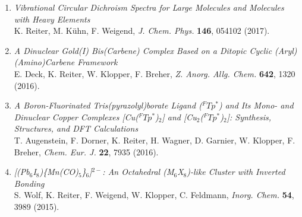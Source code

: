 \begin{enumerate}
\item \textit{Vibrational Circular Dichroism Spectra for Large Molecules and Molecules with Heavy Elements}\\
K. Reiter, M. Kühn, F. Weigend, \textit{J. Chem. Phys.} \textbf{146}, 054102 (2017).

\item \textit{A Dinuclear Gold(I) Bis(Carbene) Complex Based on a Ditopic Cyclic (Aryl)\\(Amino)Carbene Framework}\\
E. Deck, K. Reiter, W. Klopper, F. Breher, \textit{Z. Anorg. Allg. Chem.} \textbf{642}, 1320 (2016).

\item \textit{A Boron-Fluorinated Tris(pyrazolyl)borate Ligand ($^FTp^*$) and Its Mono- and Dinuclear Copper Complexes [Cu($^FTp^*$)$_2$] and [Cu$_2$($^FTp^*$)$_2$]: Synthesis, Structures, and DFT Calculations}\\
T. Augenstein, F. Dorner, K. Reiter, H. Wagner, D. Garnier, W. Klopper, F. Breher, \textit{Chem. Eur. J.} \textbf{22}, 7935 (2016).

\item \textit{[(Pb$_6$I$_8$)\{Mn(CO)$_5$\}$_6$]$^{2-}$: An Octahedral (M$_6$X$_8$)-like Cluster with Inverted Bonding}\\
S. Wolf, K. Reiter, F. Weigend, W. Klopper, C. Feldmann, \textit{Inorg. Chem.} \textbf{54}, 3989 (2015).
\end{enumerate}